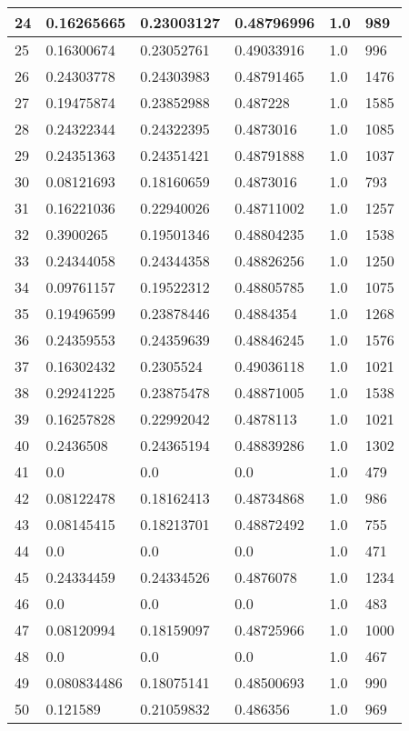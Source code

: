 \begin{longtable}{|l|l|l|l|l|l|}
24 & 0.16265665 & 0.23003127 & 0.48796996 & 1.0 & 989 \\ \hline 
25 & 0.16300674 & 0.23052761 & 0.49033916 & 1.0 & 996 \\ \hline 
26 & 0.24303778 & 0.24303983 & 0.48791465 & 1.0 & 1476 \\ \hline 
27 & 0.19475874 & 0.23852988 & 0.487228 & 1.0 & 1585 \\ \hline 
28 & 0.24322344 & 0.24322395 & 0.4873016 & 1.0 & 1085 \\ \hline 
29 & 0.24351363 & 0.24351421 & 0.48791888 & 1.0 & 1037 \\ \hline 
30 & 0.08121693 & 0.18160659 & 0.4873016 & 1.0 & 793 \\ \hline 
31 & 0.16221036 & 0.22940026 & 0.48711002 & 1.0 & 1257 \\ \hline 
32 & 0.3900265 & 0.19501346 & 0.48804235 & 1.0 & 1538 \\ \hline 
33 & 0.24344058 & 0.24344358 & 0.48826256 & 1.0 & 1250 \\ \hline 
34 & 0.09761157 & 0.19522312 & 0.48805785 & 1.0 & 1075 \\ \hline 
35 & 0.19496599 & 0.23878446 & 0.4884354 & 1.0 & 1268 \\ \hline 
36 & 0.24359553 & 0.24359639 & 0.48846245 & 1.0 & 1576 \\ \hline 
37 & 0.16302432 & 0.2305524 & 0.49036118 & 1.0 & 1021 \\ \hline 
38 & 0.29241225 & 0.23875478 & 0.48871005 & 1.0 & 1538 \\ \hline 
39 & 0.16257828 & 0.22992042 & 0.4878113 & 1.0 & 1021 \\ \hline 
40 & 0.2436508 & 0.24365194 & 0.48839286 & 1.0 & 1302 \\ \hline 
41 & 0.0 & 0.0 & 0.0 & 1.0 & 479 \\ \hline 
42 & 0.08122478 & 0.18162413 & 0.48734868 & 1.0 & 986 \\ \hline 
43 & 0.08145415 & 0.18213701 & 0.48872492 & 1.0 & 755 \\ \hline 
44 & 0.0 & 0.0 & 0.0 & 1.0 & 471 \\ \hline 
45 & 0.24334459 & 0.24334526 & 0.4876078 & 1.0 & 1234 \\ \hline 
46 & 0.0 & 0.0 & 0.0 & 1.0 & 483 \\ \hline 
47 & 0.08120994 & 0.18159097 & 0.48725966 & 1.0 & 1000 \\ \hline 
48 & 0.0 & 0.0 & 0.0 & 1.0 & 467 \\ \hline 
49 & 0.080834486 & 0.18075141 & 0.48500693 & 1.0 & 990 \\ \hline 
50 & 0.121589 & 0.21059832 & 0.486356 & 1.0 & 969 \\ \hline 
\end{longtable}